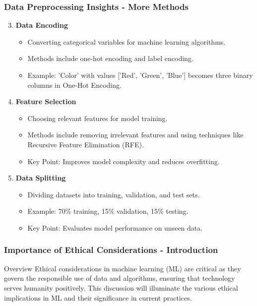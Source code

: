 \documentclass[aspectratio=169]{beamer}
\begin{document}
\begin{frame}[fragile]
    \frametitle{Data Preprocessing Insights - More Methods}
    \begin{enumerate}
        \setcounter{enumi}{2}
        \item \textbf{Data Encoding}
            \begin{itemize}
                \item Converting categorical variables for machine learning algorithms.
                \item Methods include one-hot encoding and label encoding.
                \item Example: 'Color' with values ['Red', 'Green', 'Blue'] becomes three binary columns in One-Hot Encoding.
            \end{itemize}
        
        \item \textbf{Feature Selection}
            \begin{itemize}
                \item Choosing relevant features for model training.
                \item Methods include removing irrelevant features and using techniques like Recursive Feature Elimination (RFE).
                \item Key Point: Improves model complexity and reduces overfitting.
            \end{itemize}
        
        \item \textbf{Data Splitting}
            \begin{itemize}
                \item Dividing datasets into training, validation, and test sets.
                \item Example: 70\% training, 15\% validation, 15\% testing.
                \item Key Point: Evaluates model performance on unseen data.
            \end{itemize}
    \end{enumerate}
\end{frame}

\begin{frame}[fragile]
    \frametitle{Importance of Ethical Considerations - Introduction}
    \begin{block}{Overview}
        Ethical considerations in machine learning (ML) are critical as they govern the responsible use of data and algorithms, ensuring that technology serves humanity positively. This discussion will illuminate the various ethical implications in ML and their significance in current practices.
    \end{block}
\end{frame}
\end{document}
